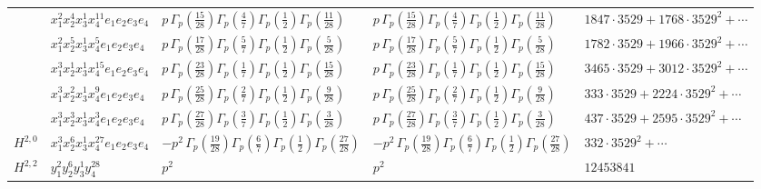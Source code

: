 \documentclass[11pt]{article}
\begin{document}
\begin{table}[ht]
{\begin{tabular}{@{}lllll@{}}
 & $x_{1}^{2} x_{2}^{4} x_{3}^{1} x_{4}^{11}  e_{1} e_{2} e_{3} e_{4}$ & $p \, \Gamma_p \left( \frac{15}{28} \right) \Gamma_p \left( \frac{4}{7} \right) \Gamma_p \left( \frac{1}{2} \right) \Gamma_p \left( \frac{11}{28} \right)$ & $p \, \Gamma_p \left( \frac{15}{28} \right) \Gamma_p \left( \frac{4}{7} \right) \Gamma_p \left( \frac{1}{2} \right) \Gamma_p \left( \frac{11}{28} \right)$ & $1847{\cdot}3529{+}1768{\cdot}3529^{2}{+}\cdots$ \\
 & $x_{1}^{2} x_{2}^{5} x_{3}^{1} x_{4}^{5}  e_{1} e_{2} e_{3} e_{4}$ & $p \, \Gamma_p \left( \frac{17}{28} \right) \Gamma_p \left( \frac{5}{7} \right) \Gamma_p \left( \frac{1}{2} \right) \Gamma_p \left( \frac{5}{28} \right)$ & $p \, \Gamma_p \left( \frac{17}{28} \right) \Gamma_p \left( \frac{5}{7} \right) \Gamma_p \left( \frac{1}{2} \right) \Gamma_p \left( \frac{5}{28} \right)$ & $1782{\cdot}3529{+}1966{\cdot}3529^{2}{+}\cdots$ \\
 & $x_{1}^{3} x_{2}^{1} x_{3}^{1} x_{4}^{15}  e_{1} e_{2} e_{3} e_{4}$ & $p \, \Gamma_p \left( \frac{23}{28} \right) \Gamma_p \left( \frac{1}{7} \right) \Gamma_p \left( \frac{1}{2} \right) \Gamma_p \left( \frac{15}{28} \right)$ & $p \, \Gamma_p \left( \frac{23}{28} \right) \Gamma_p \left( \frac{1}{7} \right) \Gamma_p \left( \frac{1}{2} \right) \Gamma_p \left( \frac{15}{28} \right)$ & $3465{\cdot}3529{+}3012{\cdot}3529^{2}{+}\cdots$ \\
 & $x_{1}^{3} x_{2}^{2} x_{3}^{1} x_{4}^{9}  e_{1} e_{2} e_{3} e_{4}$ & $p \, \Gamma_p \left( \frac{25}{28} \right) \Gamma_p \left( \frac{2}{7} \right) \Gamma_p \left( \frac{1}{2} \right) \Gamma_p \left( \frac{9}{28} \right)$ & $p \, \Gamma_p \left( \frac{25}{28} \right) \Gamma_p \left( \frac{2}{7} \right) \Gamma_p \left( \frac{1}{2} \right) \Gamma_p \left( \frac{9}{28} \right)$ & $333{\cdot}3529{+}2224{\cdot}3529^{2}{+}\cdots$ \\
 & $x_{1}^{3} x_{2}^{3} x_{3}^{1} x_{4}^{3}  e_{1} e_{2} e_{3} e_{4}$ & $p \, \Gamma_p \left( \frac{27}{28} \right) \Gamma_p \left( \frac{3}{7} \right) \Gamma_p \left( \frac{1}{2} \right) \Gamma_p \left( \frac{3}{28} \right)$ & $p \, \Gamma_p \left( \frac{27}{28} \right) \Gamma_p \left( \frac{3}{7} \right) \Gamma_p \left( \frac{1}{2} \right) \Gamma_p \left( \frac{3}{28} \right)$ & $437{\cdot}3529{+}2595{\cdot}3529^{2}{+}\cdots$ \\
\midrule
$H^{2,0}$ & $x_{1}^{3} x_{2}^{6} x_{3}^{1} x_{4}^{27}  e_{1} e_{2} e_{3} e_{4}$ & $- p^{2} \, \Gamma_p \left( \frac{19}{28} \right) \Gamma_p \left( \frac{6}{7} \right) \Gamma_p \left( \frac{1}{2} \right) \Gamma_p \left( \frac{27}{28} \right)$ & $- p^{2} \, \Gamma_p \left( \frac{19}{28} \right) \Gamma_p \left( \frac{6}{7} \right) \Gamma_p \left( \frac{1}{2} \right) \Gamma_p \left( \frac{27}{28} \right)$ & $332{\cdot}3529^{2}{+}\cdots$ \\
\midrule
$H^{2,2}$ & $y_{1}^{2} y_{2}^{6} y_{3}^{1} y_{4}^{28}$ & $p^{2} \,$ & $p^{2} \,$ & $12453841$ \\
\bottomrule
\end{tabular}
}
\renewcommand{\arraystretch}{1.0}
\end{table}
\end{document}

